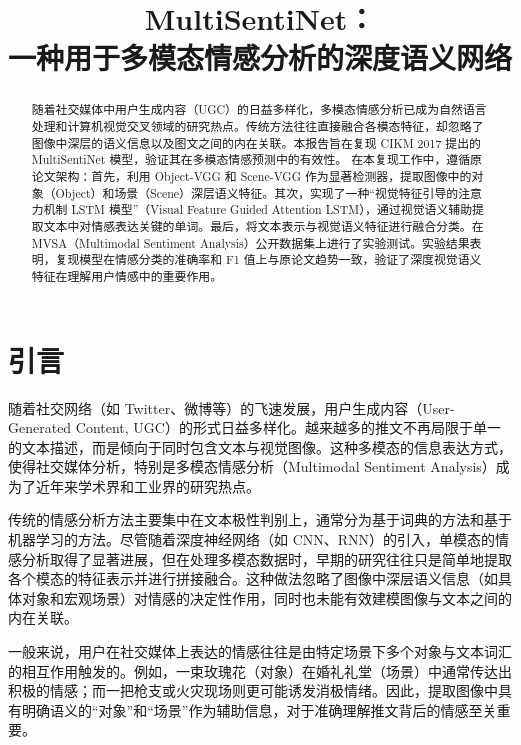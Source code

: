 \documentclass[conference, 12pt,onecolumn]{IEEEtran}
\begin{document}
\title{MultiSentiNet：\\一种用于多模态情感分析的深度语义网络}
\author{}
\maketitle

\begin{abstract}
随着社交媒体中用户生成内容（UGC）的日益多样化，多模态情感分析已成为自然语言处理和计算机视觉交叉领域的研究热点。传统方法往往直接融合各模态特征，却忽略了图像中深层的语义信息以及图文之间的内在关联。本报告旨在复现 CIKM 2017 提出的 MultiSentiNet 模型，验证其在多模态情感预测中的有效性。
在本复现工作中，遵循原论文架构：首先，利用 Object-VGG 和 Scene-VGG 作为显著检测器，提取图像中的对象（Object）和场景（Scene）深层语义特征。其次，实现了一种“视觉特征引导的注意力机制 LSTM 模型”（Visual Feature Guided Attention LSTM），通过视觉语义辅助提取文本中对情感表达关键的单词。最后，将文本表示与视觉语义特征进行融合分类。在 MVSA（Multimodal Sentiment Analysis）公开数据集上进行了实验测试。实验结果表明，复现模型在情感分类的准确率和 F1 值上与原论文趋势一致，验证了深度视觉语义特征在理解用户情感中的重要作用。
\end{abstract}

\section{引言}

随着社交网络（如 Twitter、微博等）的飞速发展，用户生成内容（User-Generated Content, UGC）的形式日益多样化。越来越多的推文不再局限于单一的文本描述，而是倾向于同时包含文本与视觉图像。这种多模态的信息表达方式，使得社交媒体分析，特别是多模态情感分析（Multimodal Sentiment Analysis）成为了近年来学术界和工业界的研究热点。

传统的情感分析方法主要集中在文本极性判别上，通常分为基于词典的方法和基于机器学习的方法。尽管随着深度神经网络（如 CNN、RNN）的引入，单模态的情感分析取得了显著进展，但在处理多模态数据时，早期的研究往往只是简单地提取各个模态的特征表示并进行拼接融合。这种做法忽略了图像中深层语义信息（如具体对象和宏观场景）对情感的决定性作用，同时也未能有效建模图像与文本之间的内在关联。

一般来说，用户在社交媒体上表达的情感往往是由特定场景下多个对象与文本词汇的相互作用触发的。例如，一束玫瑰花（对象）在婚礼礼堂（场景）中通常传达出积极的情感；而一把枪支或火灾现场则更可能诱发消极情绪。因此，提取图像中具有明确语义的“对象”和“场景”作为辅助信息，对于准确理解推文背后的情感至关重要。
\end{document}
